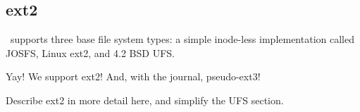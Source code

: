 \subsection{ext2}
\label{sec:modules:ext2}

\Kudos\ supports three base file system types: a simple inode-less
implementation called JOSFS, Linux ext2, and 4.2 BSD UFS.

Yay! We support ext2! And, with the journal, pseudo-ext3!

Describe ext2 in more detail here, and simplify the UFS section.
